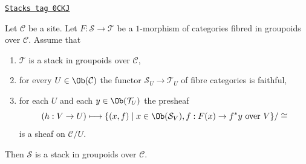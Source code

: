\begin{lemma}
\label{stacks-lemma-relative-sheaf-over-stack-is-stack}
\href{https://stacks.math.columbia.edu/tag/0CKJ}{\texttt{Stacks tag 0CKJ}}

Let $\mathcal{C}$ be a site. Let $F : \mathcal{S} \to \mathcal{T}$
be a $1$-morphism of categories fibred in groupoids over $\mathcal{C}$.
Assume that
\begin{enumerate}
\item $\mathcal{T}$ is a stack in groupoids over $\mathcal{C}$,
\item for every $U \in \Ob(\mathcal{C})$ the functor
$\mathcal{S}_U \to \mathcal{T}_U$ of fibre categories is faithful,
\item for each $U$ and each $y \in \Ob(\mathcal{T}_U)$ the presheaf
$$
(h : V \to U)
\longmapsto
\{(x, f) \mid x \in \Ob(\mathcal{S}_V), f : F(x) \to f^*y\text{ over }V\}/\cong
$$
is a sheaf on $\mathcal{C}/U$.
\end{enumerate}
Then $\mathcal{S}$ is a stack in groupoids over $\mathcal{C}$.
\end{lemma}

